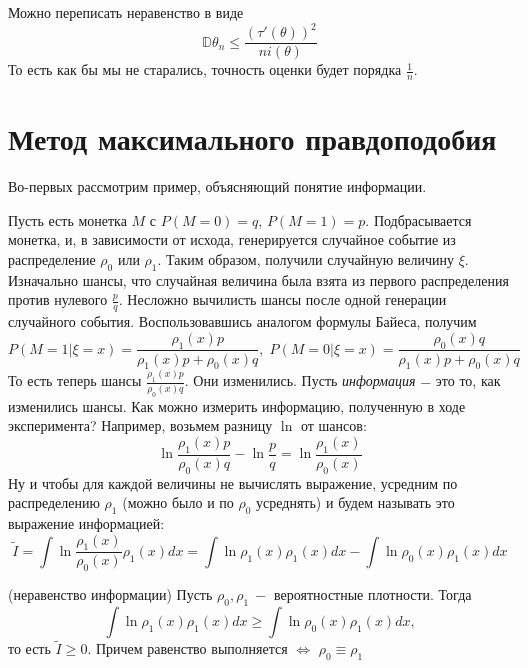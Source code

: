 \begin{remark}
Можно переписать неравенство в виде
\[
    \mathbb{D} \theta_n \leq \frac{\left(\tau'\left(\theta\right)\right) ^ 2}{n i\left(\theta\right)}
\]
То есть как бы мы не старались, точность оценки будет порядка $\frac 1 n$.
\end{remark}

\clearpage
\section*{Метод максимального правдоподобия}
Во-первых рассмотрим пример, объясняющий понятие информации.
\begin{example}
Пусть есть монетка $M$ с $P\left(M = 0\right) = q$, $P\left(M = 1\right) = p$. Подбрасывается монетка, и, в зависимости от исхода, генерируется случайное событие из распределение $\rho_0$ или $\rho_1$. Таким образом, получили случайную величину $\xi$. Изначально шансы, что случайная величина была взята из первого распределения против нулевого $\frac p q$. Несложно вычилисть шансы после одной генерации случайного события. Воспользовавшись аналогом формулы Байеса, получим
\[
    P\left(M = 1 | \xi = x\right) = \frac{\rho_1\left(x\right)p}{\rho_1\left(x\right)p + \rho_0\left(x\right)q}, \; P\left(M = 0 | \xi = x\right) = \frac{\rho_0\left(x\right)q}{\rho_1\left(x\right)p + \rho_0\left(x\right)q}
\] 
То есть теперь шансы $\frac{\rho_1\left(x\right) p}{\rho_0\left(x\right) q}$. Они изменились. Пусть \textit{информация} $-$ это то, как изменились шансы. Как можно измерить информацию, полученную в ходе эксперимента? Например, возьмем разницу $\ln$ от шансов:
\[
    \ln \frac{\rho_1\left(x\right) p}{\rho_0\left(x\right) q} - \ln \frac p q= \ln \frac{\rho_1\left(x\right)}{\rho_0\left(x\right)}
\]
Ну и чтобы для каждой величины не вычислять выражение, усредним по распределению $\rho_1$ (можно было и по $\rho_0$ усреднять) и будем называть это выражение информацией: 
\[
    \tilde{I} = \int \ln \frac{\rho_1\left(x\right)}{\rho_0\left(x\right)} \rho_1\left(x\right) dx = \int \ln \rho_1\left(x\right) \rho_1\left(x\right) dx - \int \ln \rho_0\left(x\right) \rho_1\left(x\right) dx
\]
\end{example}
\begin{statement} (неравенство информации)
Пусть $\rho_0, \rho_1 \ - $ вероятностные плотности. Тогда 
\[
    \int \ln \rho_1\left(x\right) \rho_1\left(x\right) dx \geq \int \ln \rho_0\left(x\right) \rho_1\left(x\right) dx,
\]
то есть $\tilde{I} \geq 0$. Причем равенство выполняется $\Leftrightarrow$ $\rho_0 \equiv \rho_1$
\end{statement}
